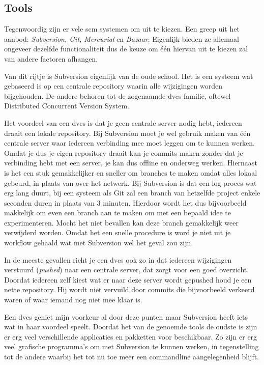 \subsection{Tools}

Tegenwoordig zijn er vele {\sc scm} systemen om uit te kiezen. Een greep uit het aanbod: \emph{Subversion, Git, Mercurial} en \emph{Bazaar}. Eigenlijk bieden ze allemaal ongeveer dezelfde functionaliteit dus de keuze om één hiervan uit te kiezen zal van andere factoren afhangen.

Van dit rijtje is Subversion eigenlijk van de oude school. Het is een systeem wat gebaseerd is op een centrale repository waarin alle wijzigingen worden bijgehouden. De andere behoren tot de zogenaamde {\sc dvcs} familie, oftewel Distributed Concurrent Version System.

Het voordeel van een {\sc dvcs} is dat je geen centrale server nodig hebt, iedereen draait een lokale repository. Bij Subversion moet je wel gebruik maken van één centrale server waar iedereen verbinding mee moet leggen om te kunnen werken. Omdat je dus je eigen repository draait kan je commits maken zonder dat je verbinding hebt met een server, je kan dus offline en onderweg werken. Hiernaast is het een stuk gemakkelijker en sneller om branches te maken omdat alles lokaal gebeurd, in plaats van over het netwerk. Bij Subversion is dat een log proces wat erg lang duurt, bij een systeem als Git zal een branch van hetzelfde project enkele seconden duren in plaats van 3 minuten. Hierdoor wordt het dus bijvoorbeeld makkelijk om even een branch aan te maken om met een bepaald idee te experimenteren. Mocht het niet bevallen kan deze branch gemakkelijk weer verwijderd worden. Omdat het een snelle procedure is word je niet uit je workflow gehaald wat met Subversion wel het geval zou zijn.

In de meeste gevallen richt je een {\sc dvcs} ook zo in dat iedereen wijzigingen verstuurd (\emph{pushed}) naar een centrale server, dat zorgt voor een goed overzicht. Doordat iedereen zelf kiest wat er naar deze server wordt gepushed houd je een nette repository. Hij wordt niet vervuild door commits die bijvoorbeeld verkeerd waren of waar iemand nog niet mee klaar is.

Een {\sc dvcs} geniet mijn voorkeur al door deze punten maar Subversion heeft iets wat in haar voordeel speelt. Doordat het van de genoemde tools de oudste is zijn er erg veel verschillende applicaties en pakketten voor beschikbaar. Zo zijn er erg veel grafische programma's om met Subversion te kunnen werken, in tegenstelling tot de andere waarbij het tot nu toe meer een commandline aangelegenheid blijft.

